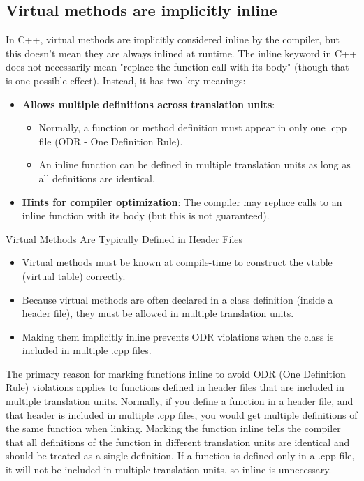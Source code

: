 \documentclass{report}
\begin{document}
    \bigbreak \noindent 
    \subsection{Virtual methods are implicitly inline}
    \bigbreak \noindent 
    In C++, virtual methods are implicitly considered inline by the compiler, but this doesn't mean they are always inlined at runtime.
    \bigbreak \noindent 
    The inline keyword in C++ does not necessarily mean "replace the function call with its body" (though that is one possible effect). Instead, it has two key meanings:
    \begin{itemize}
        \item \textbf{Allows multiple definitions across translation units}:
        \begin{itemize}
            \item Normally, a function or method definition must appear in only one .cpp file (ODR - One Definition Rule).
            \item An inline function can be defined in multiple translation units as long as all definitions are identical.
        \end{itemize}
        \item \textbf{Hints for compiler optimization}: The compiler may replace calls to an inline function with its body (but this is not guaranteed).
    \end{itemize}
    \bigbreak \noindent 
    Virtual Methods Are Typically Defined in Header Files
    \bigbreak \noindent 
    \begin{itemize}
        \item Virtual methods must be known at compile-time to construct the vtable (virtual table) correctly.
        \item Because virtual methods are often declared in a class definition (inside a header file), they must be allowed in multiple translation units.
        \item Making them implicitly inline prevents ODR violations when the class is included in multiple .cpp files.
    \end{itemize}
    \bigbreak \noindent 
    The primary reason for marking functions inline to avoid ODR (One Definition Rule) violations applies to functions defined in header files that are included in multiple translation units.
    \bigbreak \noindent 
    Normally, if you define a function in a header file, and that header is included in multiple .cpp files, you would get multiple definitions of the same function when linking.
    \bigbreak \noindent 
    Marking the function inline tells the compiler that all definitions of the function in different translation units are identical and should be treated as a single definition.
    \bigbreak \noindent 
     If a function is defined only in a .cpp file, it will not be included in multiple translation units, so inline is unnecessary.
\end{document}
